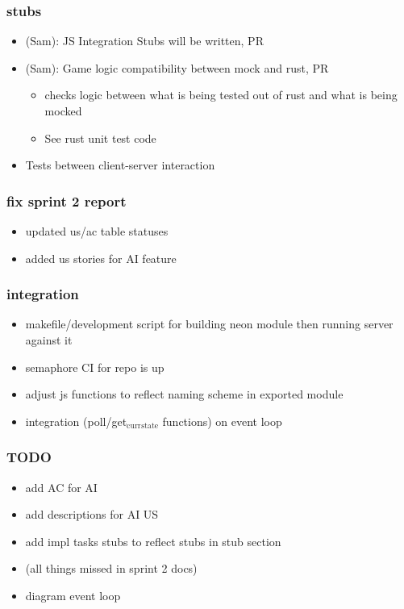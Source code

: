 \documentclass[11pt]{article}
\begin{document}
\subsubsection{stubs}
\label{sec:orgae8e63d}
\begin{itemize}
\item (Sam): JS Integration Stubs will be written, PR
\item (Sam): Game logic compatibility between mock and rust, PR
\begin{itemize}
\item checks logic between what is being tested out of rust and what is being mocked
\item See rust unit test code
\end{itemize}
\item Tests between client-server interaction
\end{itemize}
\subsubsection{fix sprint 2 report}
\label{sec:org0ee5cc1}
\begin{itemize}
\item updated us/ac table statuses
\item added us stories for AI feature
\end{itemize}
\subsubsection{integration}
\label{sec:org961c4ec}
\begin{itemize}
\item makefile/development script for building neon module then running server against it
\item semaphore CI for repo is up
\item adjust js functions to reflect naming scheme in exported module
\item integration (poll/get\(_{\text{curr}}\)\(_{\text{state}}\) functions) on event loop
\end{itemize}
\subsubsection{{\bfseries\sffamily TODO} }
\label{sec:orgfcd4a34}
\begin{itemize}
\item add AC for AI
\item add descriptions for AI US
\item add impl tasks stubs to reflect stubs in stub section
\item (all things missed in sprint 2 docs)
\item diagram event loop
\end{itemize}
\end{document}
